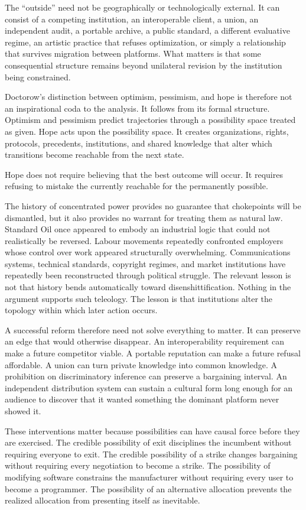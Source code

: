 \documentclass[11pt]{article}
\begin{document}
The ``outside'' need not be geographically or technologically external. It can consist of a competing institution, an interoperable client, a union, an independent audit, a portable archive, a public standard, a different evaluative regime, an artistic practice that refuses optimization, or simply a relationship that survives migration between platforms. What matters is that some consequential structure remains beyond unilateral revision by the institution being constrained.

Doctorow's distinction between optimism, pessimism, and hope is therefore not an inspirational coda to the analysis. It follows from its formal structure. Optimism and pessimism predict trajectories through a possibility space treated as given. Hope acts upon the possibility space. It creates organizations, rights, protocols, precedents, institutions, and shared knowledge that alter which transitions become reachable from the next state.

Hope does not require believing that the best outcome will occur. It requires refusing to mistake the currently reachable for the permanently possible.

The history of concentrated power provides no guarantee that chokepoints will be dismantled, but it also provides no warrant for treating them as natural law. Standard Oil once appeared to embody an industrial logic that could not realistically be reversed. Labour movements repeatedly confronted employers whose control over work appeared structurally overwhelming. Communications systems, technical standards, copyright regimes, and market institutions have repeatedly been reconstructed through political struggle. The relevant lesson is not that history bends automatically toward disenshittification. Nothing in the argument supports such teleology. The lesson is that institutions alter the topology within which later action occurs.

A successful reform therefore need not solve everything to matter. It can preserve an edge that would otherwise disappear. An interoperability requirement can make a future competitor viable. A portable reputation can make a future refusal affordable. A union can turn private knowledge into common knowledge. A prohibition on discriminatory inference can preserve a bargaining interval. An independent distribution system can sustain a cultural form long enough for an audience to discover that it wanted something the dominant platform never showed it.

These interventions matter because possibilities can have causal force before they are exercised. The credible possibility of exit disciplines the incumbent without requiring everyone to exit. The credible possibility of a strike changes bargaining without requiring every negotiation to become a strike. The possibility of modifying software constrains the manufacturer without requiring every user to become a programmer. The possibility of an alternative allocation prevents the realized allocation from presenting itself as inevitable.
\end{document}
